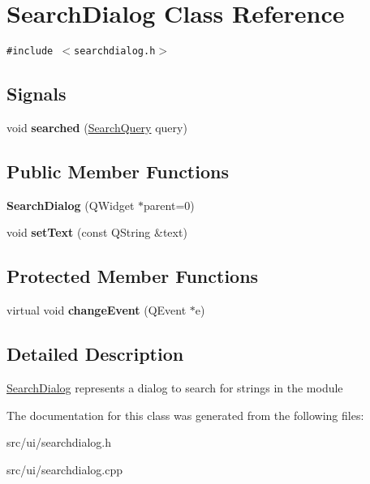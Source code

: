 \hypertarget{classSearchDialog}{
\section{SearchDialog Class Reference}
\label{classSearchDialog}
}
{\tt \#include $<$searchdialog.h$>$}

\subsection*{Signals}
\begin{CompactItemize}
\item 
\hypertarget{classSearchDialog_905b1777406bcdee448b1a8e2e3950e7}{
void \textbf{searched} (\hyperlink{classSearchQuery}{SearchQuery} query)}
\label{classSearchDialog_905b1777406bcdee448b1a8e2e3950e7}

\end{CompactItemize}
\subsection*{Public Member Functions}
\begin{CompactItemize}
\item 
\hypertarget{classSearchDialog_65ff3c491f44bdba0894e9661ad4335d}{
\textbf{SearchDialog} (QWidget $\ast$parent=0)}
\label{classSearchDialog_65ff3c491f44bdba0894e9661ad4335d}

\item 
\hypertarget{classSearchDialog_41694fcd52d8f21f0e7259cab44a60b0}{
void \textbf{setText} (const QString \&text)}
\label{classSearchDialog_41694fcd52d8f21f0e7259cab44a60b0}

\end{CompactItemize}
\subsection*{Protected Member Functions}
\begin{CompactItemize}
\item 
\hypertarget{classSearchDialog_58fdc61fba05c488cb163788cd40a405}{
virtual void \textbf{changeEvent} (QEvent $\ast$e)}
\label{classSearchDialog_58fdc61fba05c488cb163788cd40a405}

\end{CompactItemize}


\subsection{Detailed Description}
\hyperlink{classSearchDialog}{SearchDialog} represents a dialog to search for strings in the module 

The documentation for this class was generated from the following files:\begin{CompactItemize}
\item 
src/ui/searchdialog.h\item 
src/ui/searchdialog.cpp\end{CompactItemize}

